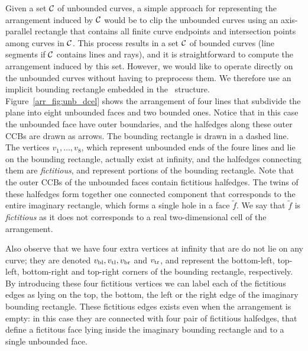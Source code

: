Given a set ${\cal C}$ of unbounded curves, a simple approach
for representing the arrangement induced by ${\cal C}$ would be
to clip the unbounded curves using an axis-parallel rectangle that
contains all finite curve endpoints and intersection points among
curves in ${\cal C}$. This process results in a set ${\cal C}$ of bounded
curves (line segments if ${\cal C}$ contains lines and rays), and it is
straightforward to compute the arrangement induced by this set.
However, we would like to operate directly on the unbounded curves
without having to preprocess them. We therefore use an implicit
bounding rectangle embedded in the \dcel\ structure.
Figure~\ref{arr_fig:unb_dcel} shows the arrangement of four lines
that subdivide the plane into eight unbounded faces and two
bounded ones. Notice that in this case the unbounded face have outer
boundaries, and the halfedges along these outer CCBs are drawn as
arrows. The bounding rectangle is drawn in a dashed line. The
vertices $v_1, \ldots, v_8$, which represent unbounded ends of
the foure lines and lie on the bounding rectangle, actually exist at
infinity, and the halfedges connecting them are \emph{fictitious}, and
represent portions of the bounding rectangle. Note that the outer CCBs
of the unbounded faces contain fictitious halfedges. The twins of these
halfedges form together one connected component that corresponds to
the entire imaginary rectangle, which forms a single hole in a face
$\tilde{f}$. We say that $\tilde{f}$ is \emph{fictitious} as it does not
corresponds to a real two-dimensional cell of the arrangement.

Also observe that we have four extra vertices at infinity that are do
not lie on any curve; they are denoted  $v_{\rm bl}, v_{\rm tl},
v_{\rm br}$ and $v_{\rm tr}$, and represent the bottom-left, top-left,
bottom-right and top-right corners of the bounding rectangle,
respectively. By introducing these four fictitious vertices we can
label each of the fictitious edges as lying on the top, the bottom,
the left or the right edge of the imaginary bounding rectangle.
These fictitious edges exists even when the arrangement is empty: in
this case they are connected with four pair of fictitious halfedges,
that define a fictitous face lying inside the imaginary bounding
rectangle and to a single unbounded face.

